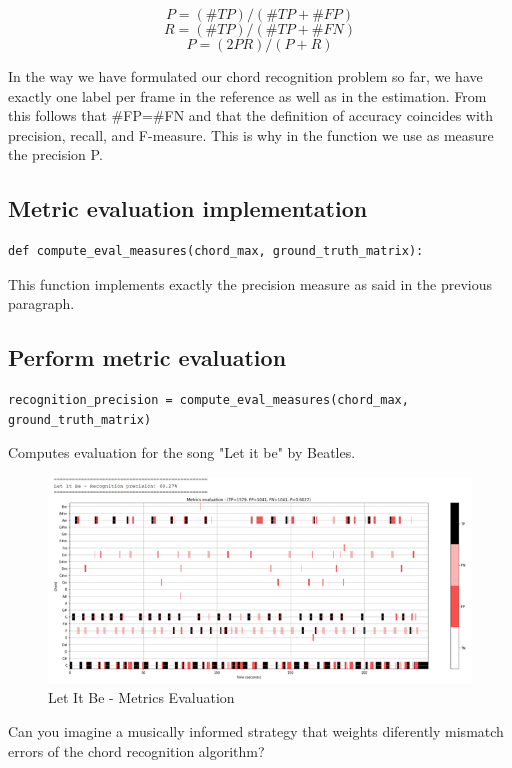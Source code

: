 \documentclass[
	12pt, %
]{fphw}
\begin{document}
\[P=(\#TP)/(\#TP + \#FP)\]
\[R=(\#TP)/(\#TP + \#FN)\]
\[P=(2PR)/(P + R)\]

In the way we have formulated our chord recognition problem so far, we have exactly one label per frame in the reference as well as in the estimation. From this follows that \#FP=\#FN and that the definition of accuracy coincides with precision, recall, and F-measure. This is why in the function we use as measure the precision P.

\subsection{Metric evaluation implementation}
\begin{lstlisting}
def compute_eval_measures(chord_max, ground_truth_matrix):
\end{lstlisting}
This function implements exactly the precision measure as said in the previous paragraph.

\subsection{Perform metric evaluation}
\begin{lstlisting}
recognition_precision = compute_eval_measures(chord_max, ground_truth_matrix)
\end{lstlisting}

Computes evaluation for the song "Let it be" by Beatles.\\

\begin{figure}[H]
 \centering
 \includegraphics[scale=1]{./images/3_let_it_be_metrics.png}
 \caption{Let It Be - Metrics Evaluation}
\end{figure}

\begin{problem}
	Can you imagine a musically informed strategy that weights diferently mismatch errors of
the chord recognition algorithm?
\end{problem}
\end{document}
